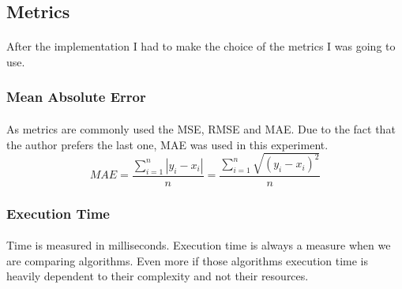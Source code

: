 \subsection{Metrics}
\paragraph{}After the implementation I had to make the choice of the metrics I was going to use.
\subsubsection{Mean Absolute Error}
\paragraph{}As metrics are commonly used the MSE, RMSE and MAE. Due to the fact that the author prefers the last one, MAE was used in this experiment.
\begin{equation}
MAE = \frac{\sum_{i=1}^{n}{|y_{i}-x_{i}|} }{n} = \frac{\sum_{i=1}^{n}\sqrt{{(y_{i}-x_{i})}^{2}}}{n}
\end{equation}
\subsubsection{Execution Time}
\paragraph{}Time is measured in milliseconds.
Execution time is always a measure when we are comparing algorithms. 
Even more if those algorithms execution time is heavily dependent to their complexity and not their resources.